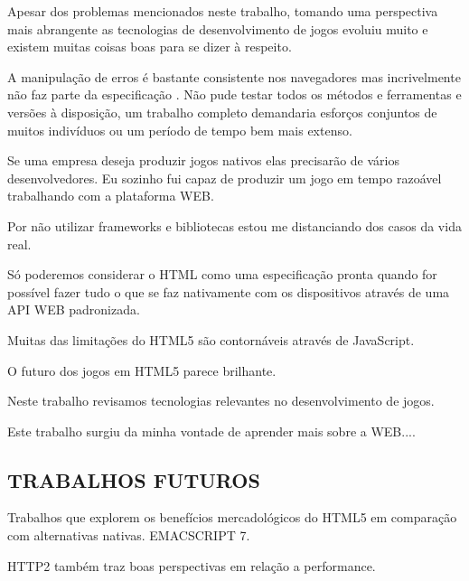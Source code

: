 \begin{draft}
Apesar dos problemas mencionados neste trabalho, tomando uma perspectiva
mais abrangente as tecnologias de desenvolvimento de jogos evoluiu muito
e existem muitas coisas boas para se dizer à respeito.

A manipulação de erros é bastante consistente nos navegadores mas 
incrivelmente não faz parte da especificação \autocite{howBrowsersWork}.
Não pude testar todos os métodos e ferramentas e versões à
disposição, um trabalho completo demandaria esforços conjuntos de
muitos indivíduos ou um período de tempo bem mais extenso. 

Se uma empresa deseja produzir jogos nativos elas precisarão de vários
desenvolvedores. Eu sozinho fui capaz de produzir um jogo em tempo
razoável trabalhando com a plataforma WEB.

Por não utilizar frameworks e bibliotecas estou me distanciando
dos casos da vida real.

Só poderemos considerar o HTML como uma especificação pronta quando
for possível fazer tudo o que se faz nativamente com os dispositivos
através de uma API WEB padronizada.

Muitas das limitações do HTML5 são contornáveis através de JavaScript.

O futuro dos jogos em HTML5 parece brilhante.

Neste trabalho revisamos tecnologias relevantes no desenvolvimento de
jogos.

Este trabalho surgiu da minha vontade de aprender mais sobre a WEB....

\subsection{TRABALHOS FUTUROS}

Trabalhos que explorem os benefícios mercadológicos do HTML5 em comparação com alternativas nativas.
EMACSCRIPT 7.

HTTP2 também traz boas perspectivas em relação a performance.

\end{draft}
